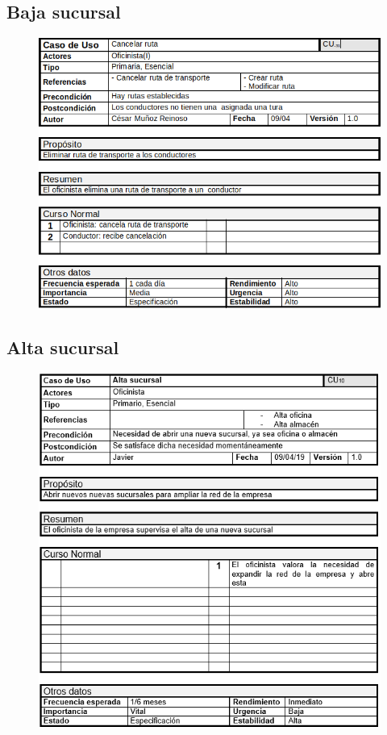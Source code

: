 \subsection{Baja sucursal}
\begin{figure}[H]
	\centering
	\includegraphics[width=16cm]{9}
\end{figure}
\subsection{Alta sucursal}
\begin{figure}[H]
	\centering
	\includegraphics[width=16cm]{10}
\end{figure}
